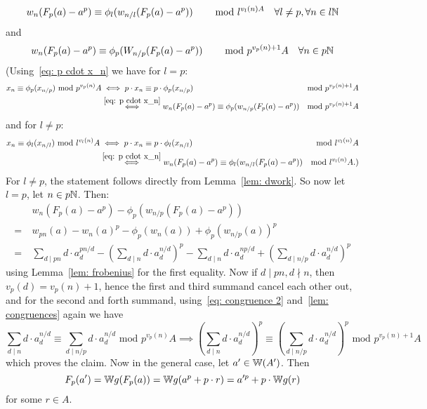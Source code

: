 \begin{beweis}
    \[
        w_n(F_p(a)-a^p) \equiv \phi_l(w_{n/l}(F_p(a)-a^p))
         \text{\hskip8mm mod }l^{v_l(n)A} \quad \forall l \neq p, \forall n \in l\mathbb{N}
    \]
    and 
    \[
      w_n(F_p(a)-a^p) \equiv \phi_p(W_{n/p}(F_p(a)-a^p)) 
      \text{\hskip8mm mod } p^{v_p(n)+1}A \quad \forall n \in p\mathbb{N}
    \]
    (Using~\ref{eq: p cdot x_n} we have for $l=p$:
    \begin{align*}
        x_n \equiv \phi_p(x_{n/p}) \text{ mod }p^{v_p(n)}A
        &\iff p \cdot x_n \equiv p \cdot \phi_p(x_{n/p}) 
        &\text{mod }p^{v_p(n)+1}A \\
        &\overset{\ref{eq: p cdot x_n}}{\iff} w_n(F_p(a)-a^p) \equiv \phi_p(w_{n/p}(F_p(a)-a^p)) 
        &\text{mod }p^{v_p(n)+1}A
    \end{align*}
    and for $l \neq p$: 
    \begin{align*}
        x_n \equiv \phi_l(x_{n/l}) \text{ mod }l^{v_l(n)}A
        &\iff p \cdot x_n \equiv p \cdot \phi_l(x_{n/l}) 
        &\text{mod }l^{v_l(n)}A \\
        &\overset{\ref{eq: p cdot x_n}}{\iff} w_n(F_p(a)-a^p) \equiv \phi_l(w_{n/l}(F_p(a)-a^p)) 
        &\text{mod }l^{v_l(n)}A.)
    \end{align*}
    For $l \neq p$, the statement follows directly from Lemma~\ref{lem: dwork}.
    So now let $l = p$, let $n \in p\mathbb{N}$. Then:
    \begin{align*}
        &w_n(F_p(a)-a^p) - \phi_p(w_{n/p}(F_p(a)-a^p)) \\
        = \ &w_{pn}(a) - w_n(a)^p - \phi_p(w_n(a)) + \phi_p(w_{n/p}(a))^p \\
        = \ &\sum_{d \mid pn}d \cdot a_d^{pn/d} - ( \sum_{d \mid n}d \cdot a_d^{n/d} )^p 
        - \sum_{d \mid n}d \cdot a_d^{np/d} + ( \sum_{d \mid n/p}d \cdot a_d^{n/d} )^p
    \end{align*}
    using Lemma~\ref{lem: frobenius} for the first equality.
    Now if $d \mid pn, d \nmid n$, then $v_p(d) = v_p(n)+1$, hence the first and third summand 
    cancel each other out, and for the second and forth summand, using~\ref{eq: congruence 2} and~\ref{lem: congruences}
    again we have 
    \[
        \sum_{d \mid n}d \cdot a_d^{n/d} \equiv \sum_{d \mid n/p}d \cdot a_d^{n/d}
        \text{ mod }p^{v_p(n)}A
        \implies ( \sum_{d \mid n}d \cdot a_d^{n/d} )^p  \equiv 
        ( \sum_{d \mid n/p}d \cdot a_d^{n/d} )^p
        \text{ mod }p^{v_p(n)+1}A
    \]
    which proves the claim. Now in the general case, let $a' \in \mathbb{W}(A')$.
    Then \[
        F_p(a') = \mathbb{W} g (F_p(a)) = \mathbb{W} g(a^p + p \cdot r) = a'^p + p \cdot \mathbb{W} g(r)
    \]
    for some $r \in A$.
\end{beweis}


